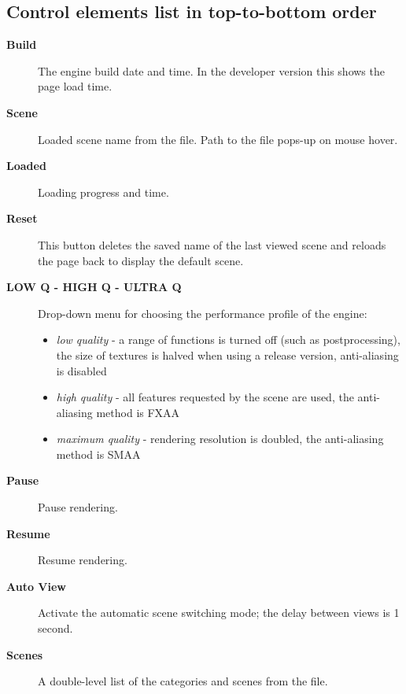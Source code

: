 \documentclass[a4paper,12pt,oneside]{sphinxmanual}
\begin{document}
\subsection{Control elements list in top-to-bottom order}
\label{viewer:id4}\begin{description}
\item[{\textbf{Build}}] \leavevmode
The engine build date and time. In the developer version this shows the page load time.

\item[{\textbf{Scene}}] \leavevmode
Loaded scene name from the  file. Path to the file pops-up on mouse hover.

\item[{\textbf{Loaded}}] \leavevmode
Loading progress and time.

\item[{\textbf{Reset}}] \leavevmode
This button deletes the saved name of the last viewed scene and reloads the page back to display the default scene.

\item[{\textbf{LOW Q - HIGH Q - ULTRA Q}}] \leavevmode
Drop-down menu for choosing the performance profile of the engine:
\begin{itemize}
\item {} 
\emph{low quality} - a range of functions is turned off (such as postprocessing), the size of textures is halved when using a release version, anti-aliasing is disabled

\item {} 
\emph{high quality} - all features requested by the scene are used, the anti-aliasing method is FXAA

\item {} 
\emph{maximum quality} - rendering resolution is doubled, the anti-aliasing method is SMAA

\end{itemize}

\item[{\textbf{Pause}}] \leavevmode
Pause rendering.

\item[{\textbf{Resume}}] \leavevmode
Resume rendering.

\item[{\textbf{Auto View}}] \leavevmode
Activate the automatic scene switching mode; the delay between views is 1 second.

\item[{\textbf{Scenes}}] \leavevmode
A double-level list of the categories and scenes from the  file.


\end{description}
\end{document}
